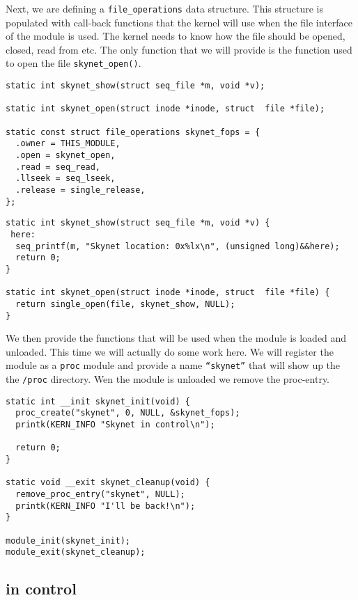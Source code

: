 \documentclass[a4paper,11pt]{article}
\begin{document}
Next, we are defining a {\tt file\_operations} data structure. This
structure is populated with call-back functions that the kernel will
use when the file interface of the module is used. The kernel needs to
know how the file should be opened, closed, read from etc. The only
function that we will provide is the function used to open the file
{\tt skynet\_open()}. 

\begin{lstlisting}
static int skynet_show(struct seq_file *m, void *v);

static int skynet_open(struct inode *inode, struct  file *file);

static const struct file_operations skynet_fops = {
  .owner = THIS_MODULE,
  .open = skynet_open,
  .read = seq_read,
  .llseek = seq_lseek,
  .release = single_release,
};
\end{lstlisting}


\begin{lstlisting}
static int skynet_show(struct seq_file *m, void *v) {
 here:
  seq_printf(m, "Skynet location: 0x%lx\n", (unsigned long)&&here);
  return 0;
}

static int skynet_open(struct inode *inode, struct  file *file) {
  return single_open(file, skynet_show, NULL);
}

\end{lstlisting}

We then provide the functions that will be used when the module is
loaded and unloaded. This time we will actually do some work here. We
will register the module as a {\tt proc} module and provide a name
{\tt ``skynet''} that will show up the the {\tt /proc} directory. Wen
the module is unloaded we remove the proc-entry.

\begin{lstlisting}
static int __init skynet_init(void) {
  proc_create("skynet", 0, NULL, &skynet_fops);
  printk(KERN_INFO "Skynet in control\n");

  return 0;
}

static void __exit skynet_cleanup(void) {
  remove_proc_entry("skynet", NULL);
  printk(KERN_INFO "I'll be back!\n");
}

module_init(skynet_init);
module_exit(skynet_cleanup);
\end{lstlisting}

\subsection{in control}
\end{document}
